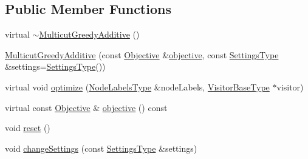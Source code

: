 \subsection*{Public Member Functions}
\begin{DoxyCompactItemize}
\item 
virtual \hyperlink{classnifty_1_1graph_1_1optimization_1_1multicut_1_1MulticutGreedyAdditive_a262be1ef8f82c6ad2de494c93fc0de10}{$\sim$\+Multicut\+Greedy\+Additive} ()
\item 
\hyperlink{classnifty_1_1graph_1_1optimization_1_1multicut_1_1MulticutGreedyAdditive_a7de01086fed750bfa72cc389f67eea53}{Multicut\+Greedy\+Additive} (const \hyperlink{classnifty_1_1graph_1_1optimization_1_1multicut_1_1MulticutGreedyAdditive_a231d778a53049db1bd2ee0a379dc2a54}{Objective} \&\hyperlink{classnifty_1_1graph_1_1optimization_1_1multicut_1_1MulticutGreedyAdditive_a64c720234c587ff35ec88e1202913c51}{objective}, const \hyperlink{classnifty_1_1graph_1_1optimization_1_1multicut_1_1MulticutGreedyAdditive_a5ab2bca40a57afb6cecb04e97204973b}{Settings\+Type} \&settings=\hyperlink{classnifty_1_1graph_1_1optimization_1_1multicut_1_1MulticutGreedyAdditive_a5ab2bca40a57afb6cecb04e97204973b}{Settings\+Type}())
\item 
virtual void \hyperlink{classnifty_1_1graph_1_1optimization_1_1multicut_1_1MulticutGreedyAdditive_a4a736b5470a2bdae3bb0ab383a804609}{optimize} (\hyperlink{classnifty_1_1graph_1_1optimization_1_1multicut_1_1MulticutGreedyAdditive_aae4ca5190ee50936fc0219aebbe95642}{Node\+Labels\+Type} \&node\+Labels, \hyperlink{classnifty_1_1graph_1_1optimization_1_1multicut_1_1MulticutGreedyAdditive_adc04def3b509e2b386fc0a6cb5f44a9a}{Visitor\+Base\+Type} $\ast$visitor)
\item 
virtual const \hyperlink{classnifty_1_1graph_1_1optimization_1_1multicut_1_1MulticutGreedyAdditive_a231d778a53049db1bd2ee0a379dc2a54}{Objective} \& \hyperlink{classnifty_1_1graph_1_1optimization_1_1multicut_1_1MulticutGreedyAdditive_a64c720234c587ff35ec88e1202913c51}{objective} () const 
\item 
void \hyperlink{classnifty_1_1graph_1_1optimization_1_1multicut_1_1MulticutGreedyAdditive_ab4588070abcde55e7f0a71bfbbd568e7}{reset} ()
\item 
void \hyperlink{classnifty_1_1graph_1_1optimization_1_1multicut_1_1MulticutGreedyAdditive_a55fb91bcf9303590dc77518bdbfb938d}{change\+Settings} (const \hyperlink{classnifty_1_1graph_1_1optimization_1_1multicut_1_1MulticutGreedyAdditive_a5ab2bca40a57afb6cecb04e97204973b}{Settings\+Type} \&settings)

\end{DoxyCompactItemize}

